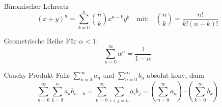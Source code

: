 \vspace*{-0.05cm}
\begin{subbox}{Binomischer Lehrsatz}
  \[(x + y)^n = \sum_{k = 0}^n  \binom{n}{k} x^{n-k}y^k \quad \text{mit:}\quad  \binom{n}{k}=\frac{n!}{k!(n-k)!}\]
\end{subbox}
\break
\vspace*{14.75cm}
\begin{subbox}{Geometrische Reihe}
  Für $\alpha<1$:
  $$\sum_{n=0}^{\infty}\alpha^{n}=\frac{1}{1-\alpha}$$
\end{subbox}
\vspace*{14.75cm}
\begin{subbox}{Cauchy Produkt}
  Falls $\sum_{n= 0}^\infty a_n$ und $\sum_{n = 0}^\infty b_n$ absolut konv, dann
  $$\sum_{n = 0}^\infty \sum_{k = 0}^n a_kb_{n-k} = \sum_{n = 0}^\infty \sum_{i+j = n} a_ib_j = \left(\sum_{n = 0}^\infty a_n\right) \cdot \left(\sum_{k = 0}^\infty b_k\right)$$
\end{subbox}

